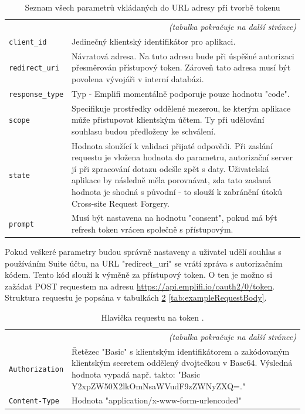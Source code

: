 \documentclass[czech, bc, kiv, he, iso690numb]{fasthesis}
\begin{document}
\begin{center}
	\begin{longtable}{p{}p{}}
	\caption{Seznam všech parametrů vkládaných do URL adresy při tvorbě tokenu \cite{emplifiDocs}}
	\label{tab:allParametersAPI}\\
	\toprule[1.5pt]
	\endhead
	\midrule
	\multicolumn{2}{r}{\textit{(tabulka pokračuje na další stránce)}}\\
	\endfoot
	\bottomrule[1.5pt]
	\endlastfoot
	\verb"client_id" &  Jedinečný klientský identifikátor pro aplikaci.\\
	\midrule
	\verb"redirect_uri" & Návratová adresa. Na tuto adresu bude při úspěšné autorizaci přesměrován přístupový token. Zároveň tato adresa musí být povolena vývojáři v interní databázi.\\
	\midrule
	\verb"response_type" & Typ - Emplifi momentálně podporuje pouze hodnotu "code".\\
	\midrule
	\verb"scope" & Specifikuje prostředky oddělené mezerou, ke kterým aplikace může přistupovat klientským účtem. Ty při udělování souhlasu budou předloženy ke schválení. \\
	\midrule
	\verb"state" & Hodnota sloužící k validaci přijaté odpovědi. Při zaslání requestu je vložena hodnota do parametru, autorizační server jí při zpracování dotazu odešle zpět s daty. Uživatelská aplikace by následně měla porovnávat, zda tato zaslaná hodnota je shodná s původní - to slouží k zabránění útoků Cross-site Request Forgery.\\
	\midrule
	\verb"prompt" & Musí být nastavena na hodnotu "consent", pokud má být refresh token vrácen společně s přístupovým.\\
	\end{longtable}
\end{center}


Pokud veškeré parametry budou správně nastaveny a uživatel udělí souhlas s používáním Suite účtu, na URL "redirect\_uri" se vrátí zpráva s autorizačním kódem. Tento kód
slouží k výměně za přístupový token. O ten je možno si zažádat POST requestem na adresu \url{https://api.emplifi.io/oauth2/0/token}. Struktura requestu je popsána v tabulkách \ref{tab:exampleRequestHeader} \ref{tab:exampleRequestBody}.

\begin{center}
	\begin{longtable}{p{}p{}}
	\caption{Hlavička requestu na token \cite{emplifiDocs}.}
	\label{tab:exampleRequestHeader}\\
	\toprule[1.5pt]
	\endhead
	\midrule
	\multicolumn{2}{r}{\textit{(tabulka pokračuje na další stránce)}}\\
	\endfoot
	\bottomrule[1.5pt]
	\endlastfoot
	\verb"Authorization" & Řetězec "Basic" s klientským identifikátorem a zakódovaným klientským secretem oddělený dvojtečkou v Base64. Výsledná hodnota vypadá např. takto: "Basic Y2xpZW50X2lkOmNsaWVudF9zZWNyZXQ=."\\
	\midrule
	\verb"Content-Type" & Hodnota "application/x-www-form-urlencoded" \\
	\end{longtable}
\end{center}
\end{document}
